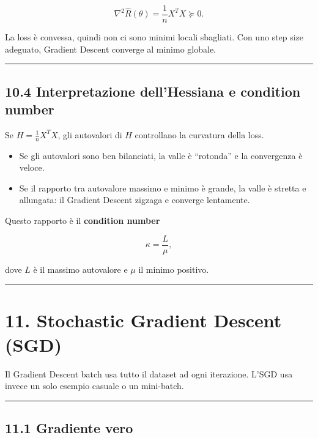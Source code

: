 \documentclass{article}
\providecommand{\tightlist}{%
  \setlength{\itemsep}{0pt}\setlength{\parskip}{0pt}}
\begin{document}
\[
\nabla^2 \hat R(\theta)=\frac{1}{n}X^TX \succeq 0.
\]

La loss è convessa, quindi non ci sono minimi locali sbagliati. Con uno
step size adeguato, Gradient Descent converge al minimo globale.

\begin{center}\rule{0.5\linewidth}{0.5pt}\end{center}

\subsection{10.4 Interpretazione dell'Hessiana e condition
number}\label{interpretazione-dellhessiana-e-condition-number}

Se \(H=\frac{1}{n}X^TX\), gli autovalori di \(H\) controllano la
curvatura della loss.

\begin{itemize}
\tightlist
\item
  Se gli autovalori sono ben bilanciati, la valle è ``rotonda'' e la
  convergenza è veloce.
\item
  Se il rapporto tra autovalore massimo e minimo è grande, la valle è
  stretta e allungata: il Gradient Descent zigzaga e converge
  lentamente.
\end{itemize}

Questo rapporto è il \textbf{condition number}

\[
\kappa = \frac{L}{\mu},
\]

dove \(L\) è il massimo autovalore e \(\mu\) il minimo positivo.

\begin{center}\rule{0.5\linewidth}{0.5pt}\end{center}

\section{11. Stochastic Gradient Descent
(SGD)}\label{stochastic-gradient-descent-sgd}

Il Gradient Descent batch usa tutto il dataset ad ogni iterazione. L'SGD
usa invece un solo esempio casuale o un mini-batch.

\begin{center}\rule{0.5\linewidth}{0.5pt}\end{center}

\subsection{11.1 Gradiente vero}\label{gradiente-vero}
\end{document}
